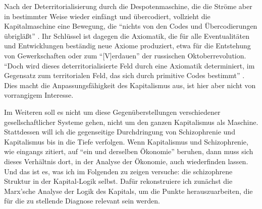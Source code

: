 \documentclass[12pt,
               paper=a4,
               twoside=false,
               onehalfspacing,
               bibliography=totoc,
               toc=graduated,
               ]{scrartcl}
\newcommand{\pc}[2]{\parencite[#1]{#2}}
\newcommand{\worries}[1]{\ifdraft{\textcolor{blue}{\texttt{(#1)}}}{}}
\begin{document}
Nach der Deterritorialisierung durch die Despotenmaschine, die die
Ströme aber in bestimmter Weise wieder einfängt und übercodiert,
vollzieht die Kapitalmaschine eine Bewegung, die "`nichts von den
Codes und Übercodierungen übrigläßt"' \pc{337}{ao}. Ihr Schlüssel ist
dagegen die Axiomatik, die für alle Eventualitäten und Entwicklungen
beständig neue Axiome produziert, etwa für die Entstehung von
Gewerkschaften oder zum "`[V]erdauen"' \pc{326}{ao} der russischen
Oktoberrevolution. "`Doch wird dieses deterritorialisierte Feld durch
eine Axiomatik determiniert, im Gegensatz zum territorialen Feld, das
sich durch primitive Codes bestimmt"' \pc{322}{ao}. Dies macht die
Anpassungsfähigkeit des Kapitalismus aus, ist hier aber nicht von
vorrangigem Interesse.


Im Weiteren soll es nicht um diese Gegenüberstellungen verschiedener
gesellschaftlicher Systeme gehen, nicht um den ganzen Kapitalismus als
Maschine. Stattdessen will ich die gegenseitige Durchdringung von
Schizophrenie und Kapitalismus bis in die Tiefe verfolgen. Wenn
Kapitalismus und Schizophrenie, wie eingangs zitiert, auf "`ein und
derselben Ökonomie"' \pc{315}{ao} beruhen, dann muss sich dieses
Verhältnis dort, in der Analyse der Ökonomie, auch wiederfinden
lassen. Und das ist es, was ich im Folgenden zu zeigen versuche: die
schizophrene Struktur in der Kapital-Logik selbst. Dafür rekonstruiere
ich zunächst die Marx'sche Analyse der Logik des Kapitals, um die
Punkte herauszuarbeiten, die für die zu stellende Diagnose relevant
sein werden.


%
%
%
%

\end{document}
